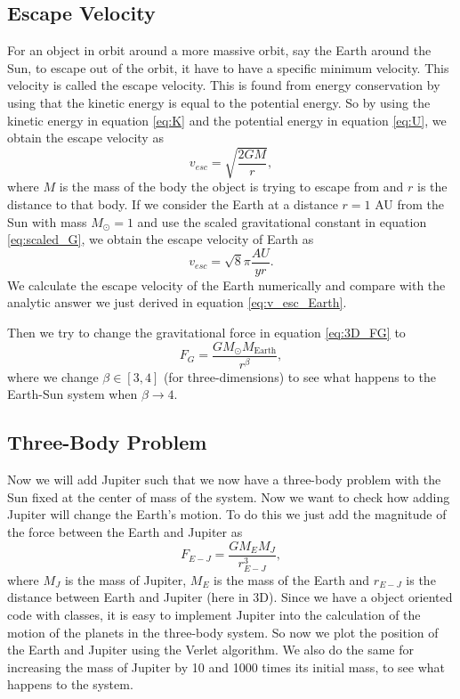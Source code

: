 \documentclass[12pt,a4paper,english]{article}
\begin{document}
\subsection{Escape Velocity}
\label{subsect:Escape vel}
For an object in orbit around a more massive orbit, say the Earth around the Sun, to escape out of the orbit, it have to have a specific minimum velocity. This velocity is called the escape velocity. This is found from energy conservation by using that the kinetic energy is equal to the potential energy. So by using the kinetic energy in equation \ref{eq:K} and the potential energy in equation \ref{eq:U}, we obtain the escape velocity as
\begin{equation}
\label{eq:v_esc}
v_{esc}=\sqrt{\frac{2GM}{r}},
\end{equation}
where $M$ is the mass of the body the object is trying to escape from and $r$ is the distance to that body. If we consider the Earth at a distance $r=1$ AU from the Sun with mass $M_{\odot}=1$ and use the scaled gravitational constant in equation \ref{eq:scaled_G}, we obtain the escape velocity of Earth as 
\begin{equation}
\label{eq:v_esc_Earth}
v_{esc}=\sqrt{8}\pi\frac{AU}{yr}.
\end{equation}
We calculate the escape velocity of the Earth numerically and compare with the analytic answer we just derived in equation \ref{eq:v_esc_Earth}.

Then we try to change the gravitational force in equation \ref{eq:3D_FG} to 
\begin{equation}
\label{eq:change_beta}
F_G=\frac{GM_{\odot}M_{\text{Earth}}}{r^{\beta}},
\end{equation}
where we change $\beta\in[3,4]$ (for three-dimensions) to see what happens to the Earth-Sun system when $\beta\rightarrow4$.

\subsection{Three-Body Problem}
\label{subsect:Add Jupiter}
Now we will add Jupiter such that we now have a three-body problem with the Sun fixed at the center of mass of the system. Now we want to check how adding Jupiter will change the Earth's motion. To do this we just add the magnitude of the force between the Earth and Jupiter as
\begin{equation}
\label{eq:Earth-Jupiter}
F_{E-J}=\frac{GM_EM_J}{r^3_{E-J}},
\end{equation}
where $M_J$ is the mass of Jupiter, $M_E$ is the mass of the Earth and $r_{E-J}$ is the distance between Earth and Jupiter (here in 3D). Since we have a object oriented code with classes, it is easy to implement Jupiter into the calculation of the motion of the planets in the three-body system. So now we plot the position of the Earth and Jupiter using the Verlet algorithm. We also do the same for increasing the mass of Jupiter by 10 and 1000 times its initial mass, to see what happens to the system.
\end{document}
